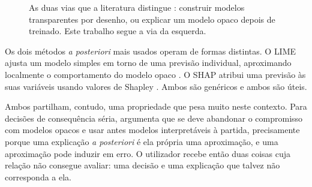 \begin{figure}[ht]
\centering
{}
\caption[As duas vias para a explicabilidade]{As duas vias que a literatura distingue
\autocite{arrieta2020xai, guidotti2018survey}: construir modelos transparentes por desenho, ou
explicar um modelo opaco depois de treinado. Este trabalho segue a via da esquerda.}
\label{fig:ctx_xai}
\end{figure}

Os dois métodos \emph{a posteriori} mais usados operam de formas distintas. O \gls{LIME} ajusta um modelo
simples em torno de uma previsão individual, aproximando localmente o comportamento do modelo opaco
\autocite{ribeiro2016lime}. O \gls{SHAP} atribui uma previsão às suas variáveis usando valores de Shapley
\autocite{lundberg2017shap}. Ambos são genéricos e ambos são úteis.

Ambos partilham, contudo, uma propriedade que pesa muito neste contexto. Para decisões de
consequência séria, \textcite{rudin2019stop} argumenta que se deve abandonar o compromisso com
modelos opacos e usar antes modelos interpretáveis à partida, precisamente porque uma explicação
\emph{a posteriori} é ela própria uma aproximação, e uma aproximação pode induzir em erro. O
utilizador recebe então duas coisas cuja relação não consegue avaliar: uma decisão e uma explicação
que talvez não corresponda a ela.


